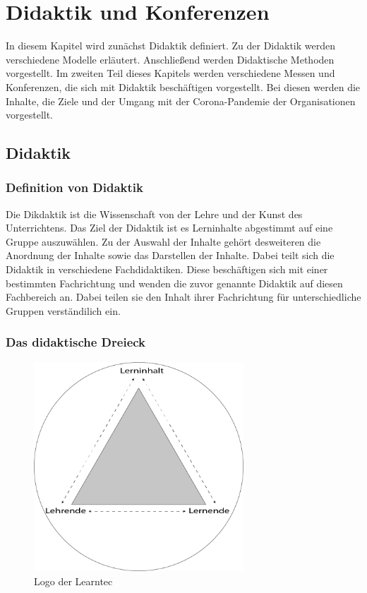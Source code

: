\chapter{Didaktik und Konferenzen}

In diesem Kapitel wird zunächst Didaktik definiert. Zu der Didaktik werden verschiedene Modelle erläutert. Anschließend werden Didaktische Methoden vorgestellt. Im zweiten Teil dieses Kapitels werden verschiedene Messen und Konferenzen, die sich mit Didaktik beschäftigen vorgestellt. Bei diesen werden die Inhalte, die Ziele und der Umgang mit der Corona-Pandemie der Organisationen vorgestellt.

\section{Didaktik}
 

\subsection{Definition von Didaktik} 

Die Dikdaktik ist die Wissenschaft von der Lehre und der Kunst des Unterrichtens. Das Ziel der Didaktik ist es Lerninhalte abgestimmt auf eine Gruppe auszuwählen. Zu der Auswahl der Inhalte gehört desweiteren die Anordnung der Inhalte sowie das Darstellen der Inhalte.\autocite{Lehner.2019} 
Dabei teilt sich die Didaktik in verschiedene Fachdidaktiken. Diese beschäftigen sich mit einer bestimmten Fachrichtung und wenden die zuvor genannte Didaktik auf diesen Fachbereich an. Dabei teilen sie den Inhalt ihrer Fachrichtung für unterschiedliche Gruppen verständilich ein.\autocite{Lehner.2019} 

\subsection{Das didaktische Dreieck}

\begin{figure}[h]
    \centering
    \includegraphics[width=0.7\textwidth]{img/Didaktisches_Dreieck.png}
    \caption[Logo: Learntec]{Logo der Learntec}
    \label{fig: Didaktisches Dreieck}
\end{figure}

